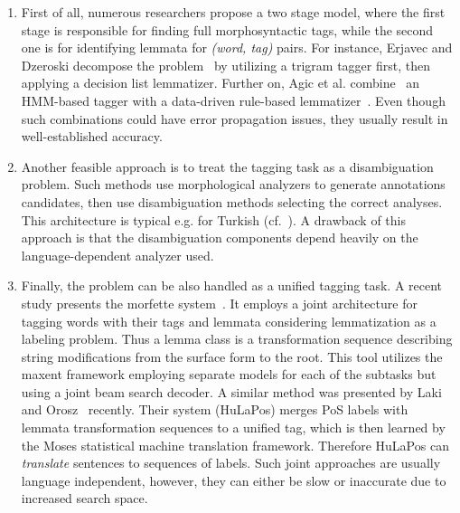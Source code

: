 \begin{enumerate}
  \item First of all, numerous researchers propose a two stage model, where the first stage is responsible for finding full morphosyntactic tags, while the second one is for identifying lemmata for \emph{(word, tag)} pairs. 
  For instance, Erjavec and Dzeroski decompose the problem~\cite{Erjavec2004} by utilizing a trigram  tagger first, then applying a decision list lemmatizer. \label{part:general-lemmatization}
  Further on, Agic et al. combine~\cite{Agic2013} an HMM-based tagger with a data-driven rule-based lemmatizer~\cite{Jongejan}. 
  Even though such combinations could have error propagation issues, they usually result in well-established accuracy.
  \item Another feasible approach is to treat the tagging task as a disambiguation problem. 
  Such methods use morphological analyzers to generate annotations candidates, then use disambiguation methods selecting the correct analyses.
  This architecture is typical e.g. for Turkish (cf.~\cite{Sak2007,Hakkani-Tur2002}).
  A drawback of this approach is that the disambiguation components depend heavily on the language-dependent analyzer used.
  \item Finally, the problem can be also handled as a unified tagging task.
  A recent study presents the morfette system~\cite{Chrupaa2008}.
  It employs a joint architecture for tagging words with their tags and lemmata considering lemmatization as a labeling problem.
  Thus a lemma class is a transformation sequence describing string modifications from the surface form to the root.
  This tool utilizes the maxent framework employing separate models for each of the subtasks but using a joint beam search decoder.
  A similar method was presented by Laki and Orosz~\cite{Laki2013} recently.
  Their system (HuLaPos) merges PoS labels with lemmata transformation sequences to a unified tag, which is then learned by the Moses statistical machine translation framework.
  Therefore HuLaPos can \emph{translate} sentences to sequences of labels.
  Such joint approaches are usually language independent, however, they can either be slow or inaccurate due to increased search space.
\end{enumerate}

